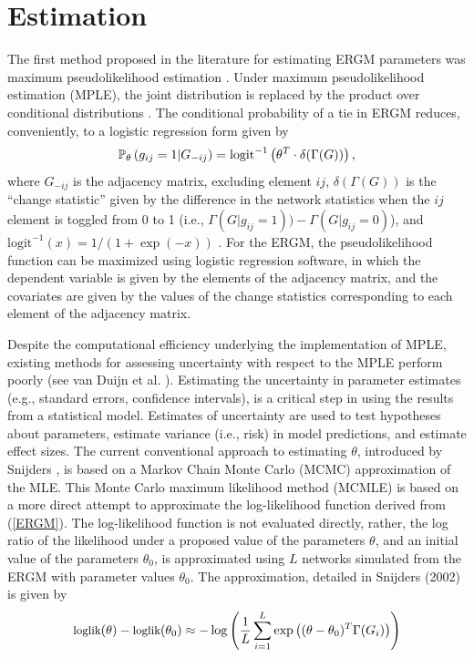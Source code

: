 \documentclass[10pt, conference, compsocconf]{IEEEtran}
\begin{document}
\section{Estimation}
The first method proposed in the literature for estimating ERGM parameters was maximum pseudolikelihood estimation \cite{StraussIkeda1990}. Under maximum pseudolikelihood estimation (MPLE), the joint distribution is replaced by the product over conditional distributions \cite{besag1986statistical}.   The conditional probability of a tie in ERGM reduces, conveniently, to a logistic regression form given by 
\begin{equation*}
\mathbb{P}_{\theta}\left(g_{ij}=1| G_{-ij} \right) = \text{\\} \text{logit}^{-1}\left( \theta^T \cdot \delta(\Gamma(G))  \right), 
\end{equation*}
where $G_{-ij}$ is the adjacency matrix, excluding element $ij$, $\delta(\Gamma(G))$ is the ``change statistic'' given by the difference in the network statistics when the $ij$ element is toggled from 0 to 1 (i.e., $\Gamma(G|g_{ij}=1))-\Gamma(G|g_{ij}=0)$), and $\text{logit}^{-1}(x)=1/(1+\exp(-x))$ \cite{goodreau2009birds}. For the ERGM, the pseudolikelihood function can be maximized using logistic regression software, in which the dependent variable is given by the elements of the adjacency matrix, and the covariates are given by the values of the change statistics corresponding to each element of the adjacency matrix. 

Despite the computational efficiency underlying the implementation of MPLE,  existing methods for assessing uncertainty with respect to the MPLE perform poorly (see van Duijn et al. \cite{vanDuijnetal2009}). Estimating the uncertainty in parameter estimates (e.g., standard errors, confidence intervals), is a critical step in using the results from a statistical model. Estimates of uncertainty are used to test hypotheses about parameters, estimate variance (i.e., risk) in model predictions, and estimate effect sizes. The current conventional approach to estimating $\theta$, introduced by Snijders \cite{snijders2002markov}, is based on a Markov Chain Monte Carlo (MCMC) approximation of the MLE.
This Monte Carlo maximum likelihood method (MCMLE) is based on a more direct attempt to approximate the  log-likelihood function derived from (\ref{ERGM}). The log-likelihood function is not evaluated directly, rather, the log ratio of the likelihood under a proposed value of the parameters $\theta$, and an initial value of the parameters $\theta_0$, is approximated using $L$ networks simulated from the ERGM with parameter values $\theta_0$. The approximation, detailed in Snijders (2002) \cite{snijders2002markov} is given by 
%
\begin{eqnarray*}
\small
\text{loglik}(\theta)-\text{loglik}(\theta_0)\approx - 
\log \left( \frac{1}{L}  \sum_{i=1}^{L}  \exp \left((\theta - \theta_0)^T  \Gamma(G_i) \right) \right)
\end{eqnarray*}
\end{document}
